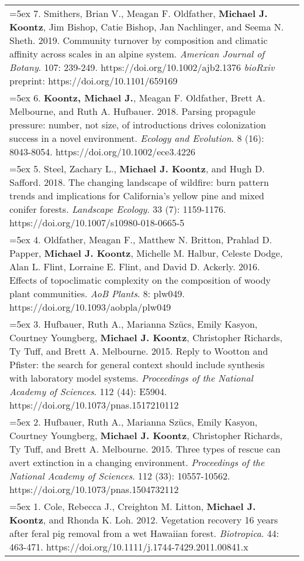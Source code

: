 \begin{longtable}{@{} >{\raggedright}p{6.25in} >{\raggedleft}X @{}}
\hangindent=5ex 7. Smithers, Brian V., Meagan F. Oldfather, \textbf{Michael J. Koontz}, Jim Bishop, Catie Bishop, Jan Nachlinger, and Seema N. Sheth. 2019. Community turnover by composition and climatic affinity across scales in an alpine system. \emph{American Journal of Botany}. 107: 239-249. https://doi.org/10.1002/ajb2.1376
\newline \emph{bioRxiv} preprint: https://doi.org/10.1101/659169 & \tabularnewline

\hangindent=5ex 6. \textbf{Koontz, Michael J.}, Meagan F. Oldfather, Brett A. Melbourne, and Ruth A. Hufbauer. 2018. Parsing propagule pressure: number, not size, of introductions drives colonization success in a novel environment. \emph{Ecology and Evolution}. 8 (16): 8043-8054. https://doi.org/10.1002/ece3.4226 &  \tabularnewline

\hangindent=5ex 5. Steel, Zachary L., \textbf{Michael J. Koontz}, and Hugh D. Safford. 2018. The changing landscape of wildfire: burn pattern trends and implications for California's yellow pine and mixed conifer forests. \emph{Landscape Ecology}. 33 (7): 1159-1176. https://doi.org/10.1007/s10980-018-0665-5 &  \tabularnewline

\hangindent=5ex 4. Oldfather, Meagan F., Matthew N. Britton, Prahlad D. Papper, \textbf{Michael J. Koontz}, Michelle M. Halbur, Celeste Dodge, Alan L. Flint, Lorraine E. Flint, and David D. Ackerly. 2016. Effects of topoclimatic complexity on the composition of woody plant communities. \emph{AoB Plants}. 8: plw049. https://doi.org/10.1093/aobpla/plw049 &  \tabularnewline

\hangindent=5ex 3. Hufbauer, Ruth A., Marianna Sz\"ucs, Emily Kasyon, Courtney Youngberg, \textbf{Michael J. Koontz}, Christopher Richards, Ty Tuff, and Brett A. Melbourne. 2015. Reply to Wootton and Pfister: the search for general context should include synthesis with laboratory model systems. \emph{Proceedings of the National Academy of Sciences}. 112 (44): E5904. https://doi.org/10.1073/pnas.1517210112 &  \tabularnewline

\hangindent=5ex 2. Hufbauer, Ruth A., Marianna Sz\"ucs, Emily Kasyon, Courtney Youngberg, \textbf{Michael J. Koontz}, Christopher Richards, Ty Tuff, and Brett A. Melbourne. 2015. Three types of rescue can avert extinction in a changing environment. \emph{Proceedings of the National Academy of Sciences}. 112 (33): 10557-10562. https://doi.org/10.1073/pnas.1504732112 &  \tabularnewline

\hangindent=5ex 1. Cole, Rebecca J., Creighton M. Litton, \textbf{Michael J. Koontz}, and Rhonda K. Loh. 2012. Vegetation recovery 16 years after feral pig removal from
a wet Hawaiian forest. \emph{Biotropica}. 44: 463-471. https://doi.org/10.1111/j.1744-7429.2011.00841.x &  \tabularnewline

\end{longtable}
